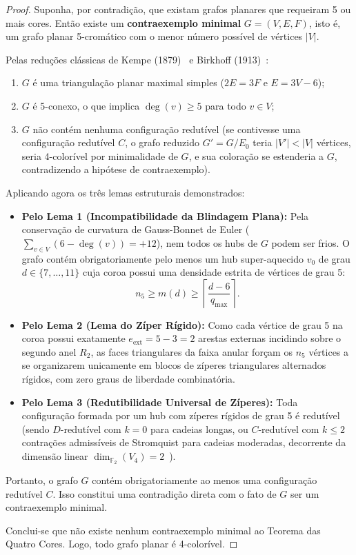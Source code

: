 \documentclass[11pt,a4paper]{article}
\theoremstyle{plain}
\theoremstyle{definition}
\begin{document}
\begin{proof}
Suponha, por contradição, que existam grafos planares que requeiram 5 ou mais cores. Então existe um \textbf{contraexemplo minimal} $G = (V, E, F)$, isto é, um grafo planar 5-cromático com o menor número possível de vértices $|V|$.

Pelas reduções clássicas de Kempe (1879)~\cite{kempe1879geographical} e Birkhoff (1913)~\cite{birkhoff1913reducibility}:
\begin{enumerate}
    \item $G$ é uma triangulação planar maximal simples ($2E = 3F$ e $E = 3V - 6$);
    \item $G$ é 5-conexo, o que implica $\deg(v) \ge 5$ para todo $v \in V$;
    \item $G$ não contém nenhuma configuração redutível (se contivesse uma configuração redutível $C$, o grafo reduzido $G' = G / E_0$ teria $|V'| < |V|$ vértices, seria 4-colorível por minimalidade de $G$, e sua coloração se estenderia a $G$, contradizendo a hipótese de contraexemplo).
\end{enumerate}

Aplicando agora os três lemas estruturais demonstrados:
\begin{itemize}
    \item \textbf{Pelo Lema 1 (Incompatibilidade da Blindagem Plana):} Pela conservação de curvatura de Gauss-Bonnet de Euler ($\sum_{v \in V} (6 - \deg(v)) = +12$), nem todos os hubs de $G$ podem ser frios. O grafo contém obrigatoriamente pelo menos um hub super-aquecido $v_0$ de grau $d \in \{7, \dots, 11\}$ cuja coroa possui uma densidade estrita de vértices de grau 5:
    \begin{equation}
    n_5 \ge m(d) \ge \left\lceil \frac{d - 6}{q_{\max}} \right\rceil.
    \end{equation}
    \item \textbf{Pelo Lema 2 (Lema do Zíper Rígido):} Como cada vértice de grau 5 na coroa possui exatamente $e_{\text{ext}} = 5 - 3 = 2$ arestas externas incidindo sobre o segundo anel $R_2$, as faces triangulares da faixa anular forçam os $n_5$ vértices a se organizarem unicamente em blocos de zíperes triangulares alternados rígidos, com zero graus de liberdade combinatória.
    \item \textbf{Pelo Lema 3 (Redutibilidade Universal de Zíperes):} Toda configuração formada por um hub com zíperes rígidos de grau 5 é redutível (sendo $D$-redutível com $k=0$ para cadeias longas, ou $C$-redutível com $k \le 2$ contrações admissíveis de Stromquist para cadeias moderadas, decorrente da dimensão linear $\dim_{\mathbb{F}_2}(V_4) = 2$~\cite{stromquist1975some}).
\end{itemize}

Portanto, o grafo $G$ contém obrigatoriamente ao menos uma configuração redutível $C$. 
Isso constitui uma contradição direta com o fato de $G$ ser um contraexemplo minimal. 

Conclui-se que não existe nenhum contraexemplo minimal ao Teorema das Quatro Cores. Logo, todo grafo planar é 4-colorível.
\end{proof}
\end{document}
